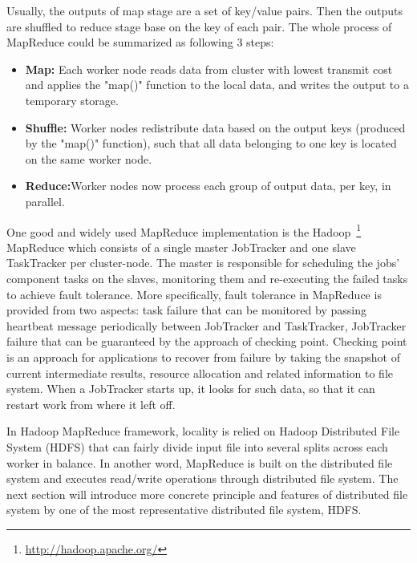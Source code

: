 Usually, the outputs of map stage are a set of key/value pairs. Then the outputs are shuffled to reduce stage base on the key of each pair. The whole process of MapReduce could be summarized as following 3 steps:
\begin{itemize}
  \item \textbf{Map:} Each worker node reads data from cluster with lowest transmit cost and applies the "map()" function to the local data, and writes the output to a temporary storage. 
  \item \textbf{Shuffle:} Worker nodes redistribute data based on the output keys (produced by the "map()" function), such that all data belonging to one key is located on the same worker node.
  \item \textbf{Reduce:}Worker nodes now process each group of output data, per key, in parallel.
\end{itemize}

One good and widely used MapReduce implementation is the Hadoop~\footnote{\url{http://hadoop.apache.org/}} MapReduce \cite{MapReduce} which consists of a single master JobTracker and one slave TaskTracker per cluster-node. The master is responsible for scheduling the jobs' component tasks on the slaves, monitoring them and re-executing the failed tasks to achieve fault tolerance. More specifically, fault tolerance in MapReduce is provided from two aspects: task failure that can be monitored by passing heartbeat message periodically between JobTracker and TaskTracker, JobTracker failure that can be guaranteed by the approach of checking point. Checking point is an approach for applications to recover from failure by taking the snapshot of current intermediate results, resource allocation and related information to file system. When a JobTracker starts up, it looks for such data, so that it can restart work from where it left off.

In Hadoop MapReduce framework, locality is relied on Hadoop Distributed File System (HDFS) that can fairly divide input file into several splits across each worker in balance. In another word, MapReduce is built on the distributed file system and executes read/write operations through distributed file system. The next section will introduce more concrete principle and features of distributed file system by one of the most representative distributed file system, HDFS. 

